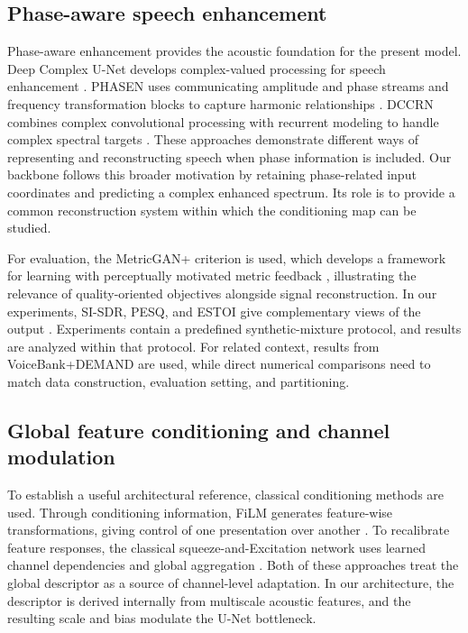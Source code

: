 \documentclass[10pt,a4paper]{article}
\begin{document}
\subsection{Phase-aware speech enhancement}


Phase-aware enhancement provides the acoustic foundation for the present model. Deep Complex U-Net develops complex-valued processing for speech enhancement \cite{dcunet}. PHASEN uses communicating amplitude and phase streams and frequency transformation blocks to capture harmonic relationships \cite{phasen}. DCCRN combines complex convolutional processing with recurrent modeling to handle complex spectral targets \cite{dccrn}. These approaches demonstrate different ways of representing and reconstructing speech when phase information is included. Our backbone follows this broader motivation by retaining phase-related input coordinates and predicting a complex enhanced spectrum. Its role is to provide a common reconstruction system within which the conditioning map can be studied.

For evaluation, the MetricGAN+ criterion is used, which develops a framework for learning with perceptually motivated metric feedback \cite{metricgan}, illustrating the relevance of quality-oriented objectives alongside signal reconstruction. In our experiments, SI-SDR, PESQ, and ESTOI give complementary views of the output \cite{sisdr,pesq,estoi}. Experiments contain a predefined synthetic-mixture protocol, and results are analyzed within that protocol. For related context, results from VoiceBank+DEMAND are used, while direct numerical comparisons need to match data construction, evaluation setting, and partitioning.


\subsection{Global feature conditioning and channel modulation}
To establish a useful architectural reference, classical conditioning methods are used. Through conditioning information, FiLM generates feature-wise transformations, giving control of one presentation over another \cite{film}. To recalibrate feature responses, the classical squeeze-and-Excitation network uses learned channel dependencies and global aggregation \cite{senet}. Both of these approaches treat the global descriptor as a source of channel-level adaptation. In our architecture, the descriptor is derived internally from multiscale acoustic features, and the resulting scale and bias modulate the U-Net bottleneck.
\end{document}
